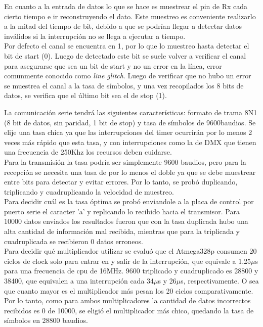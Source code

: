 En cuanto a la entrada de datos lo que se hace es muestrear el pin de Rx cada cierto tiempo e ir reconstruyendo el dato. Este muestreo es conveniente realizarlo a la mitad del tiempo de bit, debido a que se podrían llegar a detectar datos inválidos si la interrupción no se llega a ejecutar a tiempo.\\
Por defecto el canal se encuentra en 1, por lo que lo muestreo hasta detectar el bit de start (0). Luego de detectado este bit se suele volver a verificar el canal para asegurarse que sea un bit de start y no un error en la línea, error comunmente conocido como \textit{line glitch}. Luego de verificar que no hubo un error se muestrea el canal a la tasa de símbolos, y una vez recopilados los 8 bits de datos, se verifica que el último bit sea el de stop (1).

La comunicación serie tendrá las siguientes características: formato de trama 8N1 (8 bit de datos, sin paridad, 1 bit de stop) y tasa de símbolos de 9600baudios. Se elije una tasa chica ya que las interrupciones del timer ocurrirán por lo menos 2 veces más rápido que esta tasa, y con interrupciones como la de DMX que tienen una frecuencia de 250Khz los recursos deben cuidarse.\\
Para la transmisión la tasa podría ser simplemente 9600 baudios, pero para la recepción se necesita una tasa de por lo menos el doble ya que se debe muestrear entre bits para detectar y evitar errores. Por lo tanto, se probó duplicando, triplicando y cuadruplicando la velocidad de muestreo. \\
Para decidir cuál es la tasa óptima se probó enviandole a la placa de control por puerto serie el caracter 'a' y replicando lo recibido hacia el transmisor. Para 10000 datos enviados los resultados fueron que con la tasa duplicada hubo una alta cantidad de información mal recibida, mientras que para la triplicada y cuadruplicada se recibieron 0 datos erroneos. \\
Para decidir qué multiplicador utilizar se evaluó que el Atmega328p consumen 20 ciclos de clock solo para entrar en y salir de la interrupción, que equivale a 1.25\(\mu\)s para una frecuencia de cpu de 16MHz. 9600 triplicado y cuadruplicado es 28800 y 38400, que equivalen a una interrupción cada 34\(\mu\)s y 26\(\mu\)s, respectivamente. O sea que cuanto mayor es el multiplicador más pesan los 20 ciclos comparativamente. Por lo tanto, como para ambos multiplicadores la cantidad de datos incorrectos recibidos es 0 de 10000, se eligió el multiplicador más chico, quedando la tasa de símbolos en 28800 baudios.

